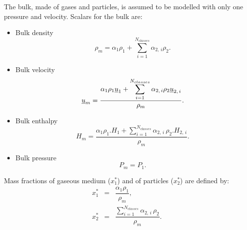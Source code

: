 The bulk, made of gases and particles, is assumed to be modelled with only one pressure and velocity.
Scalars for the bulk are:
\begin{itemize}
  \item Bulk density
     \begin{equation}
        \rho_{m} = \alpha_{1}\rho_{1} + \displaystyle \sum_{i=1}^{N_{classes}}\alpha_{2, \, i}\rho_{2}.
     \end{equation}

  \item Bulk velocity
     \begin{equation}
       \underline{u}_{m} = \dfrac{ \alpha_{1}\rho_{1} \underline{u}_{1}
                    + \displaystyle \sum_{i=1}^{N_{classes}}\alpha_{2, \, i}\rho_{2} \underline{u}_{2, \, i} }{\rho_{m}}.
     \end{equation}

  \item Bulk enthalpy
     \begin{equation}
        H_{m} = \dfrac{ \alpha_{1}\rho_{1}.H_{1}
                     + \displaystyle \sum_{i=1}^{N_{classes}}\alpha_{2, \, i} \,\rho_{2}.H_{2, \, i} }{\rho_{m}}.
     \end{equation}

  \item Bulk pressure
     \begin{equation}
       P_{m} = P_{1}.
     \end{equation}
\end{itemize}

Mass fractions of gaseous medium ($x_{1}^{*}$) and of particles ($x_{2}^{*}$) are defined by:
\begin{eqnarray*}
  x_{1}^{*} &=& \dfrac{\alpha_{1}\rho_{1}}{\rho_{m}} , \\
  x_{2}^{*} &=& \dfrac{\displaystyle \sum_{i=1}^{N_{classes}} \alpha_{2, \,i} \, \rho_{2}}{\rho_{m}}.
\end{eqnarray*}

